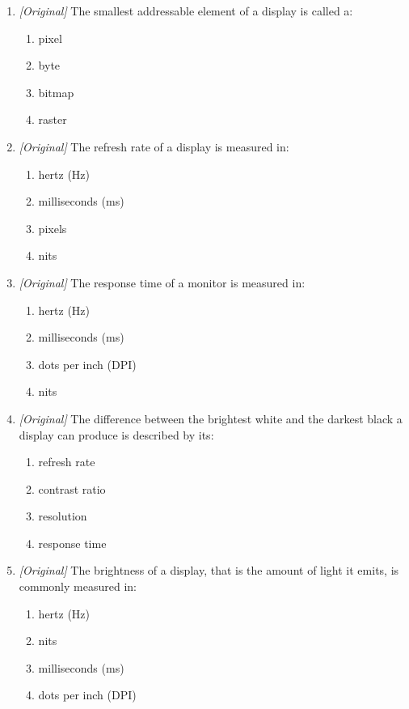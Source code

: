 \documentclass[11pt]{article}
\begin{document}
\begin{enumerate}[label=\textbf{Q\arabic*.}, leftmargin=*]
\begin{enumerate}[label=\Alph*.]
  \end{enumerate}
\item \textit{[Original]} The smallest addressable element of a display is
  called a:
  \begin{enumerate}[label=\Alph*.]
    \item pixel
    \item byte
    \item bitmap
    \item raster
  \end{enumerate}
\item \textit{[Original]} The refresh rate of a display is measured in:
  \begin{enumerate}[label=\Alph*.]
    \item hertz (Hz)
    \item milliseconds (ms)
    \item pixels
    \item nits
  \end{enumerate}
\item \textit{[Original]} The response time of a monitor is measured in:
  \begin{enumerate}[label=\Alph*.]
    \item hertz (Hz)
    \item milliseconds (ms)
    \item dots per inch (DPI)
    \item nits
  \end{enumerate}
\item \textit{[Original]} The difference between the brightest white and the
  darkest black a display can produce is described by its:
  \begin{enumerate}[label=\Alph*.]
    \item refresh rate
    \item contrast ratio
    \item resolution
    \item response time
  \end{enumerate}
\item \textit{[Original]} The brightness of a display, that is the amount of
  light it emits, is commonly measured in:
  \begin{enumerate}[label=\Alph*.]
    \item hertz (Hz)
    \item nits
    \item milliseconds (ms)
    \item dots per inch (DPI)
  \end{enumerate}

\end{enumerate}
\end{document}
